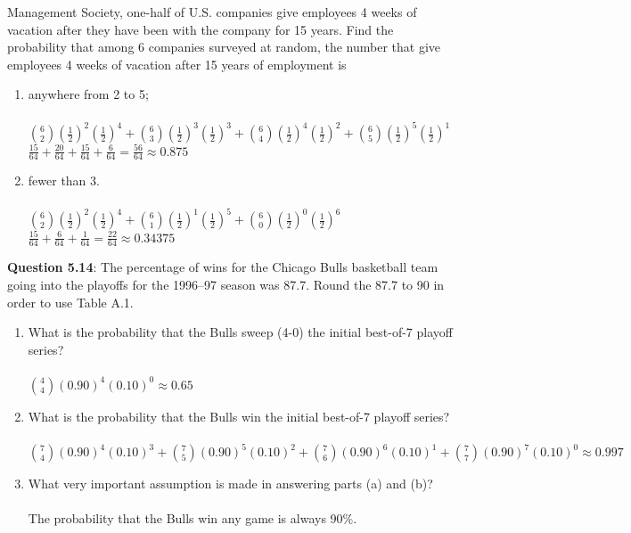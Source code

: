 \documentclass{article}
\begin{document}
    Management Society, one-half of U.S. companies give
    employees 4 weeks of vacation after they have been
    with the company for 15 years. Find the probability 
    that among 6 companies surveyed at random, the
    number that give employees 4 weeks of vacation after
    15 years of employment is
        \begin{enumerate}[label = (\alph*) ]
            \item anywhere from 2 to 5;\\\\
                \indent $\binom{6}{2}(\frac{1}{2})^{2}(\frac{1}{2})^{4} + \binom{6}{3}(\frac{1}{2})^{3}(\frac{1}{2})^{3} + \binom{6}{4}(\frac{1}{2})^{4}(\frac{1}{2})^{2} + \binom{6}{5}(\frac{1}{2})^{5}(\frac{1}{2})^{1}$\\
                \indent $\frac{15}{64} + \frac{20}{64} + \frac{15}{64} + \frac{6}{64} = \frac{56}{64} \approx 0.875$
            \item fewer than 3.\\\\
                \indent $\binom{6}{2}(\frac{1}{2})^{2}(\frac{1}{2})^{4} + \binom{6}{1}(\frac{1}{2})^{1}(\frac{1}{2})^{5} + \binom{6}{0}(\frac{1}{2})^{0}(\frac{1}{2})^{6}$\\
                \indent $\frac{15}{64} + \frac{6}{64} + \frac{1}{64} = \frac{22}{64} \approx 0.34375$
        \end{enumerate}
    \textbf{Question 5.14}: The percentage of wins for the Chicago Bulls
    basketball team going into the playoffs for the 1996–97
    season was 87.7. Round the 87.7 to 90 in order to use
    Table A.1.
        \begin{enumerate}[label = (\alph*) ]
            \item What is the probability that the Bulls sweep (4-0)
            the initial best-of-7 playoff series?\\\\
                \indent $\binom{4}{4}(0.90)^{4}(0.10)^{0} \approx 0.65$
            \item What is the probability that the Bulls win the initial 
            best-of-7 playoff series?\\\\
                \indent $\binom{7}{4}(0.90)^{4}(0.10)^{3} + \binom{7}{5}(0.90)^{5}(0.10)^{2} + \binom{7}{6}(0.90)^{6}(0.10)^{1} + \binom{7}{7}(0.90)^{7}(0.10)^{0} \approx 0.997 $
            \item What very important assumption is made in answering 
            parts (a) and (b)?\\\\
                \indent The probability that the Bulls win any game is always 90\%.
        \end{enumerate}
\end{document}
